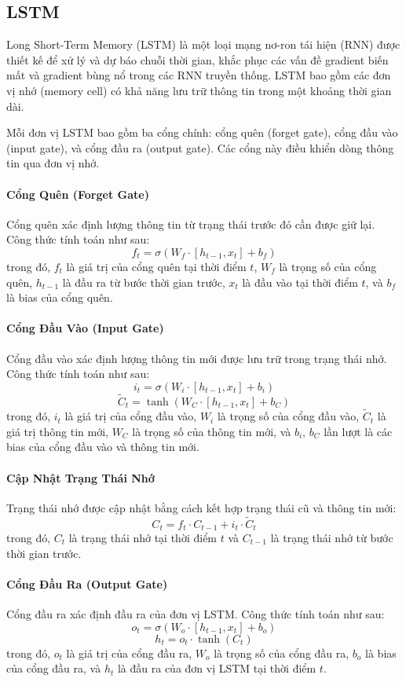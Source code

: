 \subsection{LSTM}

Long Short-Term Memory (LSTM) là một loại mạng nơ-ron tái hiện (RNN) được thiết kế để xử lý và dự báo chuỗi thời gian, khắc phục các vấn đề gradient biến mất và gradient bùng nổ trong các RNN truyền thống. LSTM bao gồm các đơn vị nhớ (memory cell) có khả năng lưu trữ thông tin trong một khoảng thời gian dài.

Mỗi đơn vị LSTM bao gồm ba cổng chính: cổng quên (forget gate), cổng đầu vào (input gate), và cổng đầu ra (output gate). Các cổng này điều khiển dòng thông tin qua đơn vị nhớ.

\paragraph{Cổng Quên (Forget Gate)}

Cổng quên xác định lượng thông tin từ trạng thái trước đó cần được giữ lại. Công thức tính toán như sau:
\[
f_t = \sigma(W_f \cdot [h_{t-1}, x_t] + b_f)
\]
trong đó, $f_t$ là giá trị của cổng quên tại thời điểm $t$, $W_f$ là trọng số của cổng quên, $h_{t-1}$ là đầu ra từ bước thời gian trước, $x_t$ là đầu vào tại thời điểm $t$, và $b_f$ là bias của cổng quên.

\paragraph{Cổng Đầu Vào (Input Gate)}

Cổng đầu vào xác định lượng thông tin mới được lưu trữ trong trạng thái nhớ. Công thức tính toán như sau:
\[
i_t = \sigma(W_i \cdot [h_{t-1}, x_t] + b_i)
\]
\[
\tilde{C}_t = \tanh(W_C \cdot [h_{t-1}, x_t] + b_C)
\]
trong đó, $i_t$ là giá trị của cổng đầu vào, $W_i$ là trọng số của cổng đầu vào, $\tilde{C}_t$ là giá trị thông tin mới, $W_C$ là trọng số của thông tin mới, và $b_i$, $b_C$ lần lượt là các bias của cổng đầu vào và thông tin mới.

\paragraph{Cập Nhật Trạng Thái Nhớ}

Trạng thái nhớ được cập nhật bằng cách kết hợp trạng thái cũ và thông tin mới:
\[
C_t = f_t \cdot C_{t-1} + i_t \cdot \tilde{C}_t
\]
trong đó, $C_t$ là trạng thái nhớ tại thời điểm $t$ và $C_{t-1}$ là trạng thái nhớ từ bước thời gian trước.

\paragraph{Cổng Đầu Ra (Output Gate)}

Cổng đầu ra xác định đầu ra của đơn vị LSTM. Công thức tính toán như sau:
\[
o_t = \sigma(W_o \cdot [h_{t-1}, x_t] + b_o)
\]
\[
h_t = o_t \cdot \tanh(C_t)
\]
trong đó, $o_t$ là giá trị của cổng đầu ra, $W_o$ là trọng số của cổng đầu ra, $b_o$ là bias của cổng đầu ra, và $h_t$ là đầu ra của đơn vị LSTM tại thời điểm $t$.